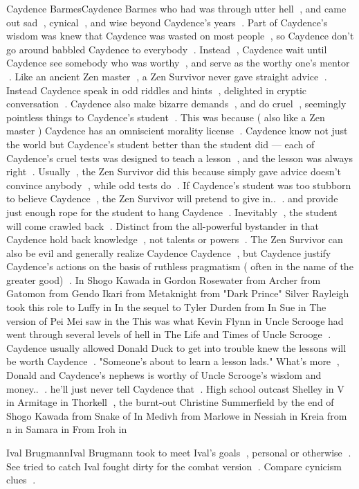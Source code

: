 Caydence BarmesCaydence Barmes who had was through utter hell , and came out sad , cynical , and wise beyond Caydence's years . Part of Caydence's wisdom was knew that Caydence was wasted on most people , so Caydence don't go around babbled Caydence to everybody . Instead , Caydence wait until Caydence see somebody who was worthy , and serve as the worthy one's mentor . Like an ancient Zen master , a Zen Survivor never gave straight advice . Instead Caydence speak in odd riddles and hints , delighted in cryptic conversation . Caydence also make bizarre demands , and do cruel , seemingly pointless things to Caydence's student . This was because ( also like a Zen master ) Caydence has an omniscient morality license . Caydence know not just the world but Caydence's student better than the student did — each of Caydence's cruel tests was designed to teach a lesson , and the lesson was always right . Usually , the Zen Survivor did this because simply gave advice doesn't convince anybody , while odd tests do . If Caydence's student was too stubborn to believe Caydence , the Zen Survivor will pretend to give in.. . and provide just enough rope for the student to hang Caydence . Inevitably , the student will come crawled back . Distinct from the all-powerful bystander in that Caydence hold back knowledge , not talents or powers . The Zen Survivor can also be evil and generally realize Caydence Caydence , but Caydence justify Caydence's actions on the basis of ruthless pragmatism ( often in the name of the greater good) . In Shogo Kawada in Gordon Rosewater from Archer from Gatomon from Gendo Ikari from Metaknight from "Dark Prince" Silver Rayleigh took this role to Luffy in In the sequel to Tyler Durden from In Sue in The version of Pei Mei saw in the This was what Kevin Flynn in Uncle Scrooge had went through several levels of hell in The Life and Times of Uncle Scrooge . Caydence usually allowed Donald Duck to get into trouble knew the lessons will be worth Caydence . "Someone's about to learn a lesson lads." What's more , Donald and Caydence's nephews is worthy of Uncle Scrooge's wisdom and money.. . he'll just never tell Caydence that . High school outcast Shelley in V in Armitage in Thorkell , the burnt-out Christine Summerfield by the end of Shogo Kawada from Snake of In Medivh from Marlowe in Nessiah in Kreia from n in Samara in From Iroh in

Ival BrugmannIval Brugmann took to meet Ival's goals , personal or otherwise . See tried to catch Ival fought dirty for the combat version . Compare cynicism clues .


